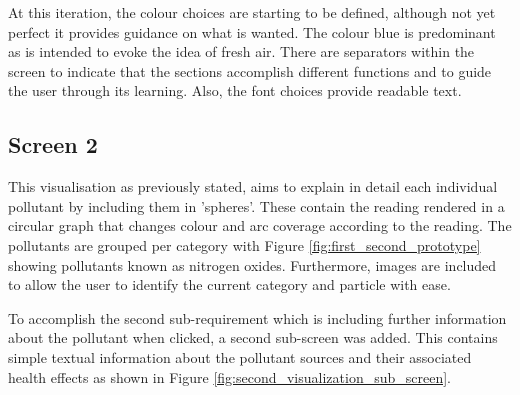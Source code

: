 At this iteration, the colour choices are starting to be defined, although not yet perfect it provides guidance on what is wanted. The colour blue is predominant as is intended to evoke the idea of fresh air. There are separators within the screen to indicate that the sections accomplish different functions and to guide the user through its learning. Also, the font choices provide readable text. 

\subsection{Screen 2}
This visualisation as previously stated, aims to explain in detail each individual pollutant by including them in 'spheres'. These contain the reading rendered in a circular graph that changes colour and arc coverage according to the reading. The pollutants are grouped per category with Figure \ref{fig:first_second_prototype} showing  pollutants known as nitrogen oxides. Furthermore, images are included to allow the user to identify the current category and particle with ease.

To accomplish the second sub-requirement which is including further information about the pollutant when clicked, a second sub-screen was added. This contains simple textual information about the pollutant sources and their associated health effects as shown in Figure \ref{fig:second_visualization_sub_screen}. 

